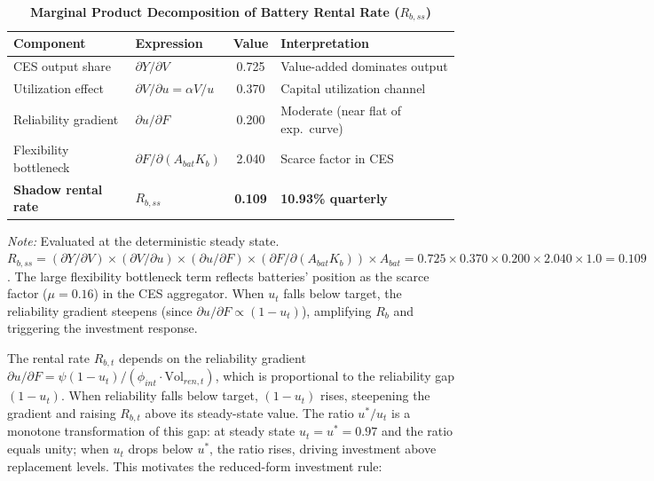 \documentclass[12pt, a4paper]{article}
\begin{document}
\begin{table}[H]
    \centering
    \caption{\textbf{Marginal Product Decomposition of Battery Rental Rate ($R_{b,ss}$)}}
    \label{tab:mpk_decomp}
    \renewcommand{\arraystretch}{1.3}
    \small
    \begin{tabular}{l l c l}
        \toprule
        \textbf{Component} & \textbf{Expression} & \textbf{Value} & \textbf{Interpretation} \\
        \midrule
        CES output share & $\partial Y / \partial V$ & 0.725 & Value-added dominates output \\
        Utilization effect & $\partial V / \partial u = \alpha V/u$ & 0.370 & Capital utilization channel \\
        Reliability gradient & $\partial u / \partial F$ & 0.200 & Moderate (near flat of exp.\ curve) \\
        Flexibility bottleneck & $\partial F / \partial (A_{bat} K_b)$ & 2.040 & Scarce factor in CES \\
        \midrule
        \textbf{Shadow rental rate} & $R_{b,ss}$ & \textbf{0.109} & \textbf{10.93\% quarterly} \\
        \bottomrule
    \end{tabular}
    \vspace{0.2cm}
    \parbox{\textwidth}{\footnotesize \textit{Note:} Evaluated at the deterministic steady state. $R_{b,ss} = (\partial Y/\partial V) \times (\partial V/\partial u) \times (\partial u/\partial F) \times (\partial F/\partial(A_{bat} K_b)) \times A_{bat} = 0.725 \times 0.370 \times 0.200 \times 2.040 \times 1.0 = 0.109$. The large flexibility bottleneck term reflects batteries' position as the scarce factor ($\mu = 0.16$) in the CES aggregator. When $u_t$ falls below target, the reliability gradient steepens (since $\partial u/\partial F \propto (1-u_t)$), amplifying $R_b$ and triggering the investment response.}
\end{table}

The rental rate $R_{b,t}$ depends on the reliability gradient $\partial u / \partial F = \psi(1-u_t)/(\phi_{int} \cdot \text{Vol}_{ren,t})$, which is proportional to the reliability gap $(1-u_t)$. When reliability falls below target, $(1-u_t)$ rises, steepening the gradient and raising $R_{b,t}$ above its steady-state value. The ratio $u^*/u_t$ is a monotone transformation of this gap: at steady state $u_t = u^* = 0.97$ and the ratio equals unity; when $u_t$ drops below $u^*$, the ratio rises, driving investment above replacement levels. This motivates the reduced-form investment rule:
\end{document}
